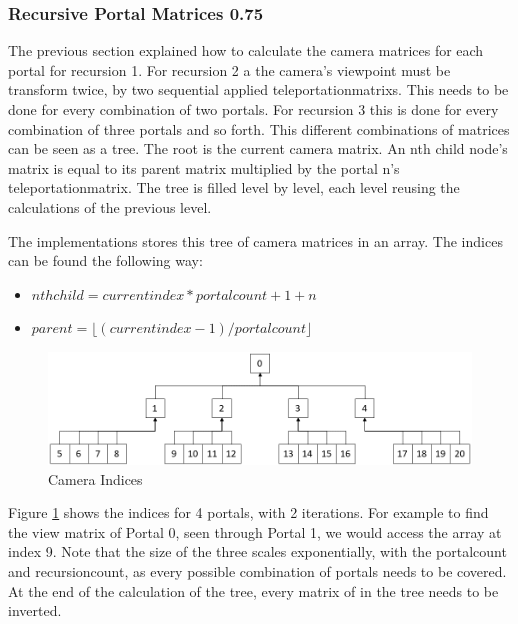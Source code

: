 \subsubsection{Recursive Portal Matrices 0.75}
\label{section:recursivecameramatrices}
The previous section explained how to calculate the camera matrices for each portal for recursion 1. For recursion 2 a the camera's viewpoint must be transform twice, by two sequential applied \glspl{teleportationmatrix}. This needs to be done for every combination of two portals. For recursion 3 this is done for every combination of three portals and so forth. This different combinations of matrices can be seen as a tree. The root is the current camera matrix. An nth child node's matrix is equal to its parent matrix multiplied by the portal n's \gls{teleportationmatrix}. The tree is filled level by level, each level reusing the calculations of the previous level.




The implementations stores this tree of camera matrices in an array. The indices can be found the following way:

\begin{itemize}
	\item $ nth child = current index * portalcount + 1 + n$
	\item $ parent = \lfloor(current index-1)/portal count\rfloor $
\end{itemize}




\begin{figure}[h]
	\includegraphics[width=\linewidth]{images/cameraindices.png}
	\caption{Camera Indices}
	\label{fig:cameraindices}
\end{figure}

Figure \ref{fig:cameraindices} shows the indices for 4 portals, with 2 iterations. For example to find the view matrix of Portal 0, seen through Portal 1, we would access the array at index 9. Note that the size of the three scales exponentially, with the \gls{portalcount} and \gls{recursioncount}, as every possible combination of portals needs to be covered. At the end of the calculation of the tree, every matrix of in the tree needs to be inverted.


